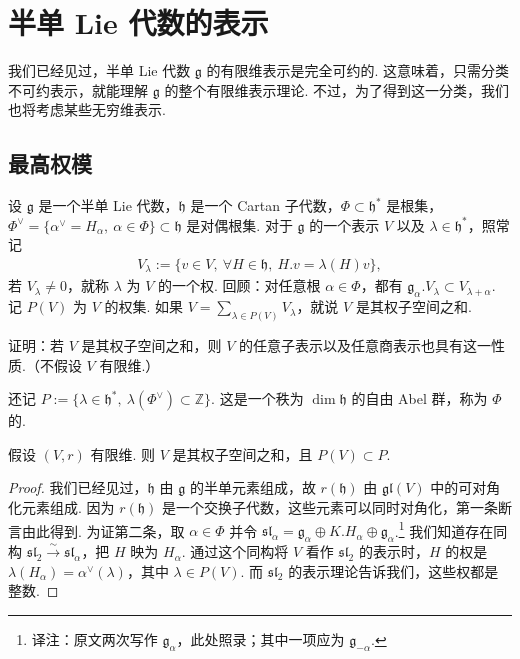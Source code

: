 \chapter{半单 Lie 代数的表示}\label{chap:ssl-4}
我们已经见过，半单 Lie 代数 $\mathfrak g$ 的有限维表示是完全可约的. 这意味着，只需分类不可约表示，就能理解 $\mathfrak g$ 的整个有限维表示理论. 不过，为了得到这一分类，我们也将考虑某些无穷维表示.
\section{最高权模}\label{sec:ssl-4-1}
设 $\mathfrak g$ 是一个半单 Lie 代数，$\mathfrak h$ 是一个 Cartan 子代数，$\Phi\subset\mathfrak h^*$ 是根集，$\Phi^\vee=\{\alpha^\vee=H_\alpha,\ \alpha\in\Phi\}\subset\mathfrak h$ 是对偶根集.
对于 $\mathfrak g$ 的一个表示 $V$ 以及 $\lambda\in\mathfrak h^*$，照常记
\begin{align*}
V_\lambda:=\{v\in V,\ \forall H\in\mathfrak h,\ H.v=\lambda(H)v\},
\end{align*}
若 $V_\lambda\neq0$，就称 $\lambda$ 为 $V$ 的一个权. 回顾：对任意根 $\alpha\in\Phi$，都有 $\mathfrak g_\alpha.V_\lambda\subset V_{\lambda+\alpha}$. 记 $P(V)$ 为 $V$ 的权集. 如果 $V=\sum_{\lambda\in P(V)}V_\lambda$，就说 $V$ 是其权子空间之和.
\begin{exercise*}
证明：若 $V$ 是其权子空间之和，则 $V$ 的任意子表示以及任意商表示也具有这一性质.（不假设 $V$ 有限维.）
\end{exercise*}
还记 $P:=\{\lambda\in\mathfrak h^*,\ \lambda(\Phi^\vee)\subset\mathbb Z\}$. 这是一个秩为 $\dim\mathfrak h$ 的自由 Abel 群，称为 $\Phi$ 的.
\begin{proposition}\label{prop:ssl-4-1-1}
假设 $(V,r)$ 有限维. 则 $V$ 是其权子空间之和，且 $P(V)\subset P$.
\end{proposition}
\begin{proof}
我们已经见过，$\mathfrak h$ 由 $\mathfrak g$ 的半单元素组成，故 $r(\mathfrak h)$ 由 $\mathfrak{gl}(V)$ 中的可对角化元素组成. 因为 $r(\mathfrak h)$ 是一个交换子代数，这些元素可以同时对角化，第一条断言由此得到. 为证第二条，取 $\alpha\in\Phi$ 并令 $\mathfrak{sl}_\alpha=\mathfrak g_\alpha\oplus K.H_\alpha\oplus\mathfrak g_\alpha$.\footnote{译注：原文两次写作 $\mathfrak g_\alpha$，此处照录；其中一项应为 $\mathfrak g_{-\alpha}$.}
我们知道存在同构 $\mathfrak{sl}_2\xrightarrow{\sim}\mathfrak{sl}_\alpha$，把 $H$ 映为 $H_\alpha$. 通过这个同构将 $V$ 看作 $\mathfrak{sl}_2$ 的表示时，$H$ 的权是 $\lambda(H_\alpha)=\alpha^\vee(\lambda)$，其中 $\lambda\in P(V)$. 而 $\mathfrak{sl}_2$ 的表示理论告诉我们，这些权都是整数.
\end{proof}
